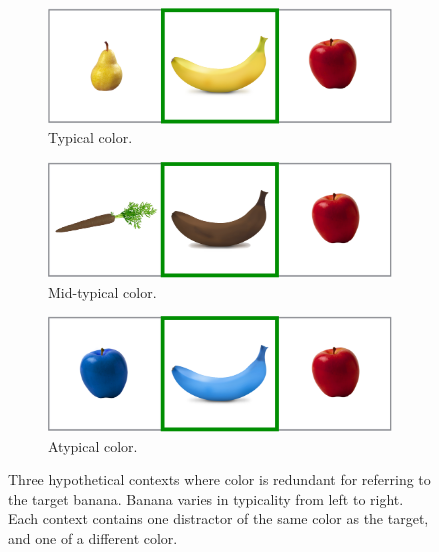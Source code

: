 \documentclass[11pt]{article}
\begin{document}
\begin{figure}[bt!]
	\begin{subfigure}{.33\textwidth}
		\centering
		\includegraphics[width=\textwidth]{pics/banana-exampleyellow.png}
		\caption{Typical color.}
		\label{fig:bananayellow}
	\end{subfigure}
	\begin{subfigure}{.33\textwidth}
		\centering
		\includegraphics[width=\textwidth]{pics/banana-examplebrown.png}
		\centering
		\caption{Mid-typical color.}
		\label{fig:bananabrown}
	\end{subfigure}
	\begin{subfigure}{.33\textwidth}
		\centering
		\includegraphics[width=\textwidth]{pics/banana-exampleblue.png}
		\caption{Atypical color.}
		\label{fig:bananablue}
	\end{subfigure}
	\caption{Three hypothetical contexts where color is redundant for referring to the target banana. Banana varies in typicality from left to right. Each context contains one distractor of the same color as the target, and one of a different color.}
	\label{fig:bananaexamples}
\end{figure}
\end{document}

